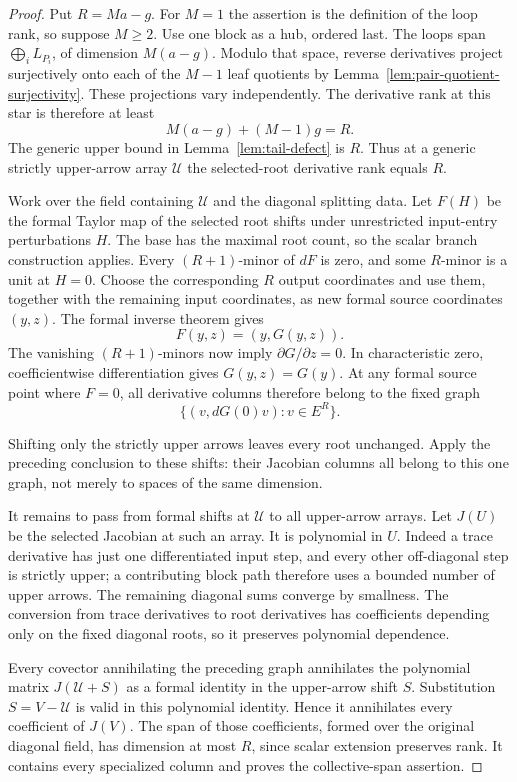 \begin{proof}
Put \(R=Ma-g\). For \(M=1\) the assertion is the definition of
the loop rank, so suppose \(M\geq2\). Use one block as a hub,
ordered last. The loops span \(\bigoplus_i L_{P_i}\), of dimension
\(M(a-g)\). Modulo that space, reverse derivatives project
surjectively onto each of the \(M-1\) leaf quotients by
Lemma~\ref{lem:pair-quotient-surjectivity}. These projections vary
independently. The derivative rank at this star is therefore at
least
\[
 M(a-g)+(M-1)g=R.
\]
The generic upper bound in Lemma~\ref{lem:tail-defect} is \(R\).
Thus at a generic strictly upper-arrow array \(\mathcal U\) the
selected-root derivative rank equals \(R\).

Work over the field containing \(\mathcal U\) and the diagonal
splitting data. Let \(F(H)\) be the formal Taylor map of the
selected root shifts under unrestricted input-entry perturbations
\(H\). The base has the maximal root count, so the scalar branch
construction applies. Every \((R+1)\)-minor of \(dF\) is zero,
and some \(R\)-minor is a unit at \(H=0\). Choose the corresponding
\(R\) output coordinates and use them, together with the remaining
input coordinates, as new formal source coordinates \((y,z)\).
The formal inverse theorem gives
\[
 F(y,z)=(y,G(y,z)).
\]
The vanishing \((R+1)\)-minors now imply
\(\partial G/\partial z=0\). In characteristic zero, coefficientwise
differentiation gives \(G(y,z)=G(y)\). At any formal source point
where \(F=0\), all derivative columns therefore belong to the fixed
graph
\[
 \{(v,dG(0)v):v\in E^R\}.
\]

Shifting only the strictly upper arrows leaves every root unchanged.
Apply the preceding conclusion to these shifts: their Jacobian
columns all belong to this one graph, not merely to spaces of the
same dimension.

It remains to pass from formal shifts at \(\mathcal U\) to all
upper-arrow arrays. Let \(J(U)\) be the selected Jacobian at such
an array. It is polynomial in \(U\). Indeed a trace derivative
has just one differentiated input step, and every other
off-diagonal step is strictly upper; a contributing block path
therefore uses a bounded number of upper arrows. The remaining
diagonal sums converge by smallness. The conversion from trace
derivatives to root derivatives has coefficients depending only
on the fixed diagonal roots, so it preserves polynomial dependence.

Every covector annihilating the preceding graph annihilates the
polynomial matrix \(J(\mathcal U+S)\) as a formal identity in
the upper-arrow shift \(S\). Substitution \(S=V-\mathcal U\)
is valid in this polynomial identity. Hence it annihilates every
coefficient of \(J(V)\). The span of those coefficients, formed
over the original diagonal field, has dimension at most \(R\),
since scalar extension preserves rank. It contains every specialized
column and proves the collective-span assertion.


\end{proof}
